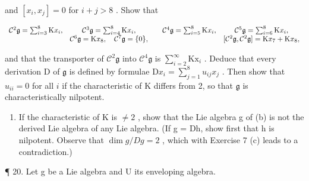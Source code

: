 and \([x_i, x_j] = 0\) for \(i + j > 8\) . Show that

\[
\begin{array}{c c} \mathcal {C} ^ {2} \mathfrak {g} = \sum_ {i = 3} ^ {8} \mathrm{K} x _ {i}, & \mathcal {C} ^ {3} \mathfrak {g} = \sum_ {i = 4} ^ {8} \mathrm{K} x _ {i}, \\ & \mathcal {C} ^ {6} \mathfrak {g} = \mathrm{K} x _ {8}, \quad \mathcal {C} ^ {7} \mathfrak {g} = \{0 \}, \end{array} \quad \begin{array}{c c} \mathcal {C} ^ {4} \mathfrak {g} = \sum_ {i = 5} ^ {8} \mathrm{K} x _ {i}, & \mathcal {C} ^ {5} \mathfrak {g} = \sum_ {i = 6} ^ {8} \mathrm{K} x _ {i}, \\ & [ \mathcal {C} ^ {2} \mathfrak {g}, \mathcal {C} ^ {2} \mathfrak {g} ] = \mathrm{K} x _ {7} + \mathrm{K} x _ {8}, \end{array}
\]

and that the transporter of \(\mathcal{C}^2\mathfrak{g}\) into \(\mathcal{C}^4\mathfrak{g}\) is \(\sum_{i=2}^{\infty}\mathrm{Kx}_i\) . Deduce that every derivation D of \(\mathfrak{g}\) is defined by formulae \(\mathrm{D}x_i = \sum_{j=1}^{8}u_{ij}x_j\) . Then show that \(u_{ii} = 0\) for all \(i\) if the characteristic of K differs from 2, so that \(\mathfrak{g}\) is characteristically nilpotent.

\begin{enumerate}
\def\labelenumi{(\alph{enumi})}
\setcounter{enumi}{2}
\tightlist
\item
  If the characteristic of K is \(\neq2\) , show that the Lie algebra g of (b) is not the derived Lie algebra of any Lie algebra. (If g = Dh, show first that h is nilpotent. Observe that \(\dim g/Dg = 2\) , which with Exercise 7 (c) leads to a contradiction.)
\end{enumerate}

¶ 20. Let g be a Lie algebra and U its enveloping algebra.

